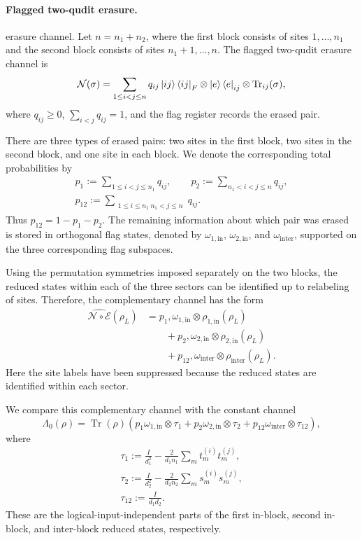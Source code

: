 \documentclass[10pt,twocolumn,superscriptaddress,aps,amsmath,amssymb,citeautoscript,floatfix,prx]{revtex4-2}
\theoremstyle{plain}
\theoremstyle{plain}
\theoremstyle{plain}
\theoremstyle{plain}
\theoremstyle{plain}
\theoremstyle{plain}
\theoremstyle{plain}
\theoremstyle{definition}
\theoremstyle{plain}
\begin{document}
\paragraph{Flagged two-qudit erasure.}

 erasure channel. Let $n=n_1+n_2$, where the first block consists of sites $1,\ldots,n_1$ and the second block consists of sites $n_1+1,\ldots,n$. 
 The flagged two-qudit erasure channel is
$$
\mathcal N(\sigma)
=
\sum_{1\le i<j\le n}
q_{ij}
\ket{ij}\bra{ij}_F
\otimes
\ket e\bra e_{ij}
\otimes
\operatorname{Tr}_{ij}(\sigma),
$$
where $q_{ij}\ge 0$, $\sum_{i<j}q_{ij}=1$, and the flag register records the erased pair.

There are three types of erased pairs: two sites in the first block, two sites in the second block, and one site in each block.
 We denote the corresponding total probabilities by
$$
\begin{gathered}
p_1
:=
\sum_{1\le i<j\le n_1}
q_{ij},
\qquad
p_2
:=
\sum_{n_1<i<j\le n}
q_{ij},
\\
p_{12}
:=
\sum_{\substack{1\le i\le n_1\ n_1<j\le n}}
q_{ij}.
\end{gathered}
$$
Thus $p_{12}=1-p_1-p_2$. The remaining information about which pair was erased is stored in orthogonal flag states, denoted by $\omega_{1,\mathrm{in}}$, $\omega_{2,\mathrm{in}}$, and $\omega_{\mathrm{inter}}$, 
supported on the three corresponding flag subspaces.

Using the permutation symmetries imposed separately on the two blocks, the reduced states within each of the three sectors can be identified up to relabeling of sites. 
Therefore, the complementary channel has the form
$$
\begin{aligned}
\widehat{\mathcal N\circ\mathcal E}(\rho_L)
&=
p_1,
\omega_{1,\mathrm{in}}
\otimes
\rho_{1,\mathrm{in}}(\rho_L)
\\
&\qquad
+
p_2,
\omega_{2,\mathrm{in}}
\otimes
\rho_{2,\mathrm{in}}(\rho_L)
\\
&\qquad
+
p_{12},
\omega_{\mathrm{inter}}
\otimes
\rho_{\mathrm{inter}}(\rho_L).
\end{aligned}
$$
Here the site labels have been suppressed because the reduced states are identified within each sector.

We compare this complementary channel with the constant channel
$$
\Lambda_0(\rho)
=
\operatorname{Tr}(\rho)
\left(
p_1\omega_{1,\mathrm{in}}\otimes\tau_1
+
p_2\omega_{2,\mathrm{in}}\otimes\tau_2
+
p_{12}\omega_{\mathrm{inter}}\otimes\tau_{12}
\right),
$$
where
$$
\begin{gathered}
\tau_1
:=
\frac{I}{d_1^2}
-
\frac{2}{d_1n_1}
\sum_m t_m^{(i)}t_m^{(j)},
\\
\tau_2
:=
\frac{I}{d_2^2}
-
\frac{2}{d_2n_2}
\sum_m s_m^{(i)}s_m^{(j)},
\\
\tau_{12}
:=
\frac{I}{d_1d_2}.
\end{gathered}
$$
These are the logical-input-independent parts of the first in-block, second in-block, and inter-block reduced states, respectively. 
\end{document}
